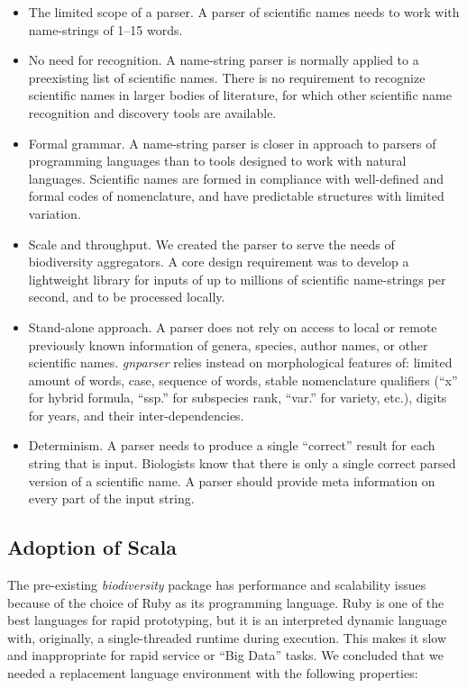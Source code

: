 \documentclass{bmcart}
\begin{document}
\begin{itemize}
  \item The limited scope of a parser. A parser of scientific names needs to work with name-strings of 1--15 words.

   \item No need for recognition.  A name-string parser is normally applied to a preexisting list of scientific names. There is no requirement to recognize scientific names in larger bodies of literature, for which other scientific name recognition and discovery tools are available.

  \item Formal grammar. A name-string parser is closer in approach to parsers of programming languages than to tools designed to work with natural languages. Scientific names are formed in compliance with well-defined and formal codes of nomenclature, and have predictable structures with limited variation.

  \item Scale and throughput. We created the parser to serve the  needs of biodiversity aggregators. A core design requirement was to develop a lightweight library for inputs of up to millions of scientific name-strings per second, and to be processed locally.

  \item Stand-alone approach. A parser does not rely on access to local or remote previously known information of genera, species, author names, or other scientific names. \textit{gnparser} relies instead on morphological features of: limited amount of words, case, sequence of words, stable nomenclature qualifiers (``x'' for hybrid formula, ``ssp.'' for subspecies rank, ``var.'' for variety, etc.), digits for years, and their inter-dependencies.

  \item Determinism. A parser needs to produce a single ``correct'' result for each string that is input. Biologists know that there is only a single correct parsed version of a scientific name. A parser should provide meta information on every part of the input string.
\end{itemize}

\subsection*{Adoption of Scala}

The pre-existing \textit{biodiversity} package has performance and scalability issues because of the choice of Ruby as its programming language. Ruby is one of the best languages for rapid prototyping, but it is an interpreted dynamic language with, originally, a single-threaded runtime during execution. This makes it slow and inappropriate for rapid service or ``Big Data'' tasks. We concluded that we needed a replacement language environment with the following properties:
\end{document}
